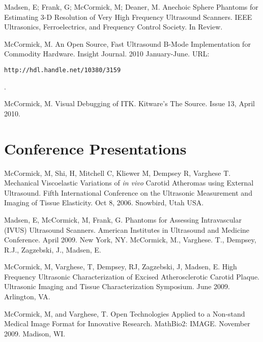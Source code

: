 \documentclass[margin,line]{res}
\begin{document}
\begin{resume}
Madsen, E; Frank, G; McCormick, M; Deaner, M.  Anechoic Sphere Phantoms for
Estimating 3-D Resolution of Very High Frequency Ultrasound Scanners.
IEEE Ultrasonics, Ferroelectrics, and Frequency Control Society.  In Review.

McCormick, M.  An Open Source, Fast Ultrasound B-Mode Implementation for
Commodity Hardware.  Insight Journal.  2010 January-June.
\vspace*{-.25in}  
URL: \begin{verbatim}http://hdl.handle.net/10380/3159\end{verbatim}.
\vspace*{-.35in}  

McCormick, M.  Visual Debugging of ITK.  Kitware's The Source.  Issue 13, April
2010.

\section{\sc Conference Presentations}
McCormick, M, Shi, H, Mitchell C, Kliewer M, Dempsey R, Varghese T.   Mechanical Viscoelastic Variations of \textit{in vivo} Carotid Atheromas using External Ultrasound.  Fifth International Conference on the Ultrasonic Measurement and Imaging of Tissue Elasticity.  Oct 8, 2006.  Snowbird, Utah USA.

Madsen, E,  McCormick, M,  Frank, G.  Phantoms for Assessing
Intravascular (IVUS) Ultrasound Scanners.  American Institutes in
Ultrasound and Medicine Conference.  April 2009.  New York, NY.
McCormick, M., Varghese. T., Dempsey, R.J., Zagzebski, J., Madsen, E.

McCormick, M, Varghese, T, Dempsey, RJ, Zagzebski, J, Madsen, E.  High Frequency Ultrasonic Characterization of Excised Atherosclerotic
Carotid Plaque.  Ultrasonic Imaging and Tissue Characterization
Symposium.  June 2009.  Arlington, VA.

McCormick, M, and Varghese, T.  Open Technologies Applied to a Non-stand Medical
Image Format for Innovative Research.  MathBio2: IMAGE.  November 2009.  Madison, WI.


% 
% 
% 
% 


\end{resume}
\end{document}
